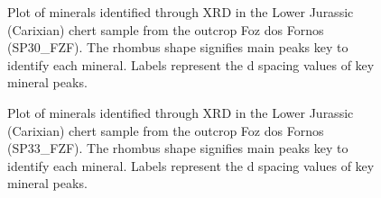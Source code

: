 \documentclass[
  a4paper,
  DIV=11,
  numbers=noendperiod]{scrreprt}
\begin{document}
\begin{figure}


\caption{\label{fig-xrd-sp30}Plot of minerals identified through XRD in
the Lower Jurassic (Carixian) chert sample from the outcrop Foz dos
Fornos (SP30\_FZF). The rhombus shape signifies main peaks key to
identify each mineral. Labels represent the d spacing values of key
mineral peaks.}

\end{figure}%

\begin{figure}


\caption{\label{fig-xrd-sp33}Plot of minerals identified through XRD in
the Lower Jurassic (Carixian) chert sample from the outcrop Foz dos
Fornos (SP33\_FZF). The rhombus shape signifies main peaks key to
identify each mineral. Labels represent the d spacing values of key
mineral peaks.}

\end{figure}%
\end{document}

